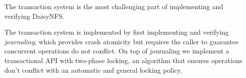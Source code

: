 The transaction system is the most challenging part of implementing and
verifying DaisyNFS.

The transaction system is implemented by first implementing and verifying
\emph{journaling}, which provides crash atomicity but requires the caller to
guarantee concurrent operations do not conflict. On top of journaling we
implement a transactional API with two-phase locking, an algorithm that ensures
operations don't conflict with an automatic and general locking policy.


%





%

